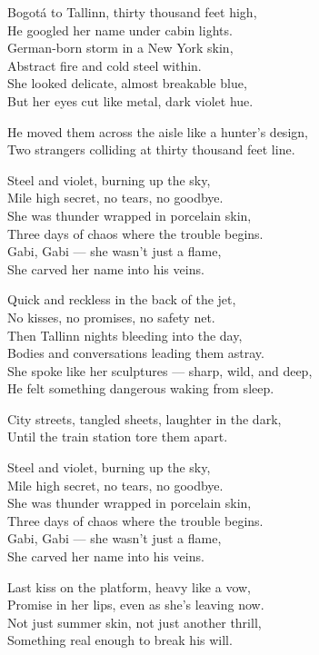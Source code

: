 \begin{lyrics}
Bogotá to Tallinn, thirty thousand feet high,\\
He googled her name under cabin lights.\\
German-born storm in a New York skin,\\
Abstract fire and cold steel within.\\
She looked delicate, almost breakable blue,\\
But her eyes cut like metal, dark violet hue.

He moved them across the aisle like a hunter’s design,\\
Two strangers colliding at thirty thousand feet line.

Steel and violet, burning up the sky,\\
Mile high secret, no tears, no goodbye.\\
She was thunder wrapped in porcelain skin,\\
Three days of chaos where the trouble begins.\\
Gabi, Gabi — she wasn’t just a flame,\\
She carved her name into his veins.

Quick and reckless in the back of the jet,\\
No kisses, no promises, no safety net.\\
Then Tallinn nights bleeding into the day,\\
Bodies and conversations leading them astray.\\
She spoke like her sculptures — sharp, wild, and deep,\\
He felt something dangerous waking from sleep.

City streets, tangled sheets, laughter in the dark,\\
Until the train station tore them apart.

Steel and violet, burning up the sky,\\
Mile high secret, no tears, no goodbye.\\
She was thunder wrapped in porcelain skin,\\
Three days of chaos where the trouble begins.\\
Gabi, Gabi — she wasn’t just a flame,\\
She carved her name into his veins.

Last kiss on the platform, heavy like a vow,\\
Promise in her lips, even as she’s leaving now.\\
Not just summer skin, not just another thrill,\\
Something real enough to break his will.


\end{lyrics}
